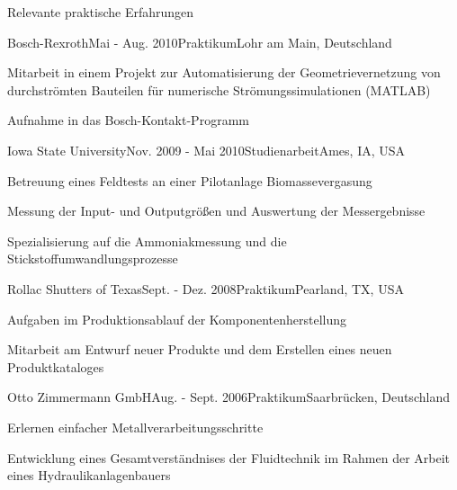 \documentclass{resume}
\begin{document}
\begin{rSection}{Relevante praktische Erfahrungen}
\begin{rSubsection}{Bosch-Rexroth}{Mai - Aug. 2010}{Praktikum}{Lohr am Main,
Deutschland}
\item Mitarbeit in einem Projekt zur Automatisierung der Geometrievernetzung von
durchströmten Bauteilen für numerische Strömungssimulationen (MATLAB)
\item Aufnahme in das Bosch-Kontakt-Programm
\end{rSubsection}


\begin{rSubsection}{Iowa State University}{Nov. 2009 - Mai
2010}{Studienarbeit}{Ames, IA, USA}
\item Betreuung eines Feldtests an einer Pilotanlage Biomassevergasung
\item Messung der Input- und Outputgrößen und Auswertung der Messergebnisse
\item Spezialisierung auf die Ammoniakmessung und die Stickstoffumwandlungsprozesse
\end{rSubsection}


\begin{rSubsection}{Rollac Shutters of Texas}{Sept. - Dez.
2008}{Praktikum}{Pearland, TX, USA}
\item Aufgaben im Produktionsablauf der Komponentenherstellung
\item Mitarbeit am Entwurf neuer Produkte und dem Erstellen eines neuen Produktkataloges
\end{rSubsection}


\begin{rSubsection}{Otto Zimmermann GmbH}{Aug. - Sept.
2006}{Praktikum}{Saarbrücken, Deutschland}
\item Erlernen einfacher Metallverarbeitungsschritte
\item Entwicklung eines Gesamtverständnises der Fluidtechnik im Rahmen der
Arbeit eines Hydraulikanlagenbauers
\end{rSubsection}

\end{rSection}


\end{document}
